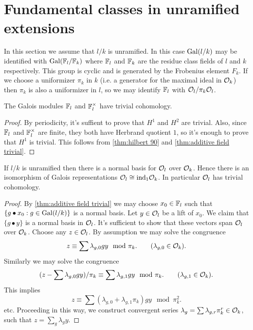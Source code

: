 \section{Fundamental classes in unramified extensions}

In this section we assume that $l/k$ is unramified.
In this case $\mathrm{Gal}(l/k)$ may be identified with $\mathrm{Gal}({\mathbb F}_l / {\mathbb F}_k)$ where
${\mathbb F}_l$ and ${\mathbb F}_k$ are the residue class fields of $l$ and $k$ respectively.
This group is cyclic and is generated by the Frobenius element $F_k$.
If we choose a uniformizer $\pi_k$ in $k$ (i.e. a generator for the maximal ideal in ${\mathcal O}_k$)
then $\pi_k$ is also a uniformizer in $l$, so we may identify ${\mathbb F}_l$ with ${\mathcal O}_l / \pi_k {\mathcal O}_l$.

\begin{lemma} \label{lem:finite field trivial}
	The Galois modules ${\mathbb F}_l$ and ${\mathbb F}_l^\times$ have trivial cohomology.
\end{lemma}

\begin{proof}
	By periodicity, it's suffient to prove that $H^1$ and $H^2$ are trivial.
	Also, since ${\mathbb F}_l$ and ${\mathbb F}_l^\times$ are finite, they both have Herbrand quotient $1$,
	so it's enough to prove that $H^1$ is trivial.
	This follows from \ref{thm:hilbert 90} and \ref{thm:additive field trivial}.
\end{proof}


\begin{lemma} \label{lem:unramified additive trivial}
	If $l/k$ is unramified then there is a normal basis for ${\mathcal O}_l$ over ${\mathcal O}_k$.
	Hence there is an isomorphism of Galois representations ${\mathcal O}_l \cong \mathrm{ind}_1 {\mathcal O}_k$.
	In particular ${\mathcal O}_l$ has trivial cohomology.
\end{lemma}

\begin{proof}
	By \ref{thm:additive field trivial}
	we may choose $x_0 \in {\mathbb F}_l$
	such that $\{g \bullet x_0 :g \in \mathrm{Gal}(l/k)\}$ is a normal basis.
	Let $y \in {\mathcal O}_l$ be a lift of $x_0$.
	We claim that $\{g \bullet y\}$ is a normal basis	in ${\mathcal O}_l$.
	It's sufficient to show that these vectors span ${\mathcal O}_l$ over ${\mathcal O}_k$.
	Choose any $z \in {\mathcal O}_l$. By assumption we may solve the congruence
	\[
		z \equiv \sum \lambda_{g,0} g y \mod \pi_k.
		\qquad
		(\lambda_{g,0} \in {\mathcal O}_k).
	\]
	Similarly we may solve the congruence
	\[
		(z - \sum \lambda_{g,0} g y) / \pi_k \equiv \sum \lambda_{g,1} g y \mod \pi_k.
		\qquad
		(\lambda_{g,1} \in {\mathcal O}_k).
	\]
	This implies
	\[
		z \equiv \sum (\lambda_{g,0} + \lambda_{g,1} \pi_k) g y \mod \pi_k^2.
	\]
	etc.
	Proceeding in this way, we construct convergent series
	$\lambda_{g} = \sum \lambda_{g,r}\pi_k^r \in {\mathcal O}_k$,
	such that $z = \sum_g \lambda_g y$.
\end{proof}





